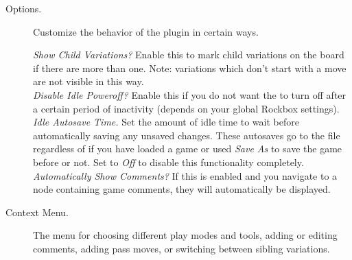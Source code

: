\begin {description}
\item [Options. ]
    Customize the behavior of the plugin in certain ways.

    \emph {Show Child Variations? } Enable this to mark child variations on the board
    if there are more than one.  Note: variations which don't start with a move are
    not visible in this way. \\
    \emph {Disable Idle Poweroff? } Enable this if you do not want the \dap{} to turn
    off after a certain period of inactivity (depends on your global Rockbox
    settings). \\
    \emph {Idle Autosave Time. } Set the amount of idle time to wait before
    automatically saving any unsaved changes.  These autosaves go to the file
     regardless of if you have loaded a game or used
    \emph {Save As} to save the game before or not.  Set to \emph {Off} to disable
    this functionality completely. \\
    \emph {Automatically Show Comments? } If this is enabled and you navigate to a
    node containing game comments, they will automatically be displayed. \\

\item [Context Menu. ]
    The menu for choosing different play modes and tools, adding or editing
    comments, adding pass moves, or switching between sibling variations.


\end{description}

